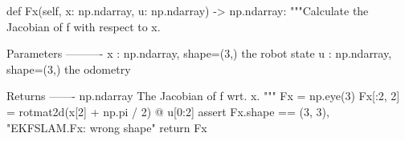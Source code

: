 \begin{pythoncode}
def Fx(self, x: np.ndarray, u: np.ndarray) -> np.ndarray:
    """Calculate the Jacobian of f with respect to x.

    Parameters
    ----------
    x : np.ndarray, shape=(3,)
    the robot state
    u : np.ndarray, shape=(3,)
    the odometry

    Returns
    -------
    np.ndarray
    The Jacobian of f wrt. x.
    """
    Fx = np.eye(3)
    Fx[:2, 2] = rotmat2d(x[2] + np.pi / 2) @ u[0:2]
    assert Fx.shape == (3, 3), "EKFSLAM.Fx: wrong shape"
    return Fx
\end{pythoncode}